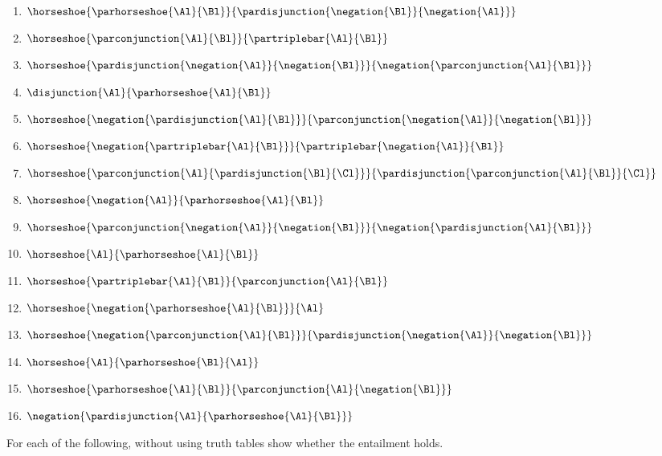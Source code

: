 \begin{multicols}{2}
\begin{enumerate}
\item {$\horseshoe{\parhorseshoe{\Al}{\Bl}}{\pardisjunction{\negation{\Bl}}{\negation{\Al}}}$}
\item {$\horseshoe{\parconjunction{\Al}{\Bl}}{\partriplebar{\Al}{\Bl}}$}
\item {$\horseshoe{\pardisjunction{\negation{\Al}}{\negation{\Bl}}}{\negation{\parconjunction{\Al}{\Bl}}}$}
\item {$\disjunction{\Al}{\parhorseshoe{\Al}{\Bl}}$}
\item {$\horseshoe{\negation{\pardisjunction{\Al}{\Bl}}}{\parconjunction{\negation{\Al}}{\negation{\Bl}}}$}
\item {$\horseshoe{\negation{\partriplebar{\Al}{\Bl}}}{\partriplebar{\negation{\Al}}{\Bl}}$}
\item {$\horseshoe{\parconjunction{\Al}{\pardisjunction{\Bl}{\Cl}}}{\pardisjunction{\parconjunction{\Al}{\Bl}}{\Cl}}$}
\item {$\horseshoe{\negation{\Al}}{\parhorseshoe{\Al}{\Bl}}$}
\item {$\horseshoe{\parconjunction{\negation{\Al}}{\negation{\Bl}}}{\negation{\pardisjunction{\Al}{\Bl}}}$}
\item {$\horseshoe{\Al}{\parhorseshoe{\Al}{\Bl}}$}
\item {$\horseshoe{\partriplebar{\Al}{\Bl}}{\parconjunction{\Al}{\Bl}}$}
\item {$\horseshoe{\negation{\parhorseshoe{\Al}{\Bl}}}{\Al}$}
\item {$\horseshoe{\negation{\parconjunction{\Al}{\Bl}}}{\pardisjunction{\negation{\Al}}{\negation{\Bl}}}$}
\item {$\horseshoe{\Al}{\parhorseshoe{\Bl}{\Al}}$}
\item {$\horseshoe{\parhorseshoe{\Al}{\Bl}}{\parconjunction{\Al}{\negation{\Bl}}}$}
\item {$\negation{\pardisjunction{\Al}{\parhorseshoe{\Al}{\Bl}}}$}
\end{enumerate}
\end{multicols}


For each of the following, without using truth tables show whether the entailment holds.

